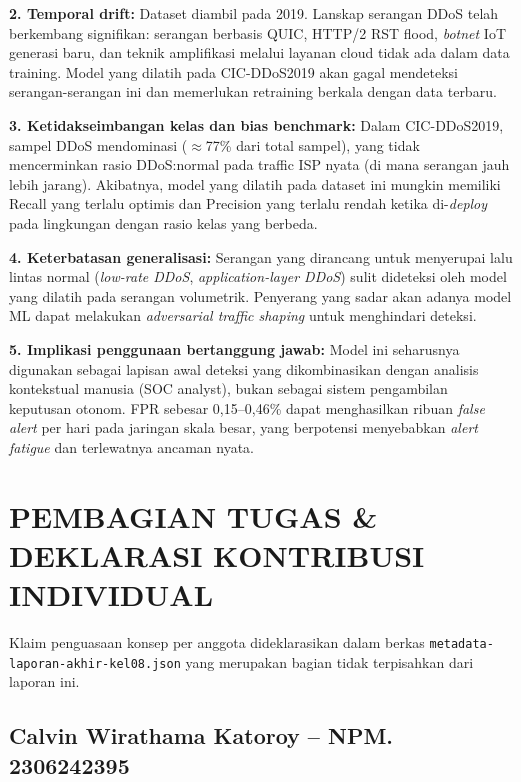 \documentclass[11pt,a4paper,oneside]{report}
\begin{document}
\textbf{2. Temporal drift:} Dataset diambil pada 2019. Lanskap serangan DDoS telah berkembang signifikan: serangan berbasis QUIC, HTTP/2 RST flood, \textit{botnet} IoT generasi baru, dan teknik amplifikasi melalui layanan cloud tidak ada dalam data training. Model yang dilatih pada CIC-DDoS2019 akan gagal mendeteksi serangan-serangan ini dan memerlukan retraining berkala dengan data terbaru.

\textbf{3. Ketidakseimbangan kelas dan bias benchmark:} Dalam CIC-DDoS2019, sampel DDoS mendominasi ($\approx$77\% dari total sampel), yang tidak mencerminkan rasio DDoS:normal pada traffic ISP nyata (di mana serangan jauh lebih jarang). Akibatnya, model yang dilatih pada dataset ini mungkin memiliki Recall yang terlalu optimis dan Precision yang terlalu rendah ketika di-\textit{deploy} pada lingkungan dengan rasio kelas yang berbeda.

\textbf{4. Keterbatasan generalisasi:} Serangan yang dirancang untuk menyerupai lalu lintas normal (\textit{low-rate DDoS}, \textit{application-layer DDoS}) sulit dideteksi oleh model yang dilatih pada serangan volumetrik. Penyerang yang sadar akan adanya model ML dapat melakukan \textit{adversarial traffic shaping} untuk menghindari deteksi.

\textbf{5. Implikasi penggunaan bertanggung jawab:} Model ini seharusnya digunakan sebagai lapisan awal deteksi yang dikombinasikan dengan analisis kontekstual manusia (SOC analyst), bukan sebagai sistem pengambilan keputusan otonom. FPR sebesar 0,15--0,46\% dapat menghasilkan ribuan \textit{false alert} per hari pada jaringan skala besar, yang berpotensi menyebabkan \textit{alert fatigue} dan terlewatnya ancaman nyata.

\chapter{PEMBAGIAN TUGAS \& DEKLARASI KONTRIBUSI INDIVIDUAL}
\label{bab:kontribusi}

Klaim penguasaan konsep per anggota dideklarasikan dalam berkas \texttt{metadata-laporan-akhir-kel08.json} yang merupakan bagian tidak terpisahkan dari laporan ini.

\section{Calvin Wirathama Katoroy -- NPM. 2306242395}
\end{document}
